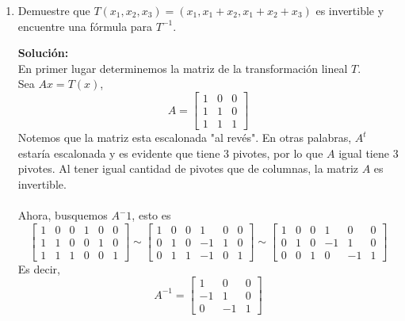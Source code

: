 \documentclass[12pt]{article}
\newenvironment{solucion}
{\begin{mdframed}[backgroundcolor=black!10]
		{\bf Solución:}\\
	}
	{
	\end{mdframed}
}
\newenvironment{preguntas}
{\begin{enumerate}\itemsep12pt
	}
	{
	\end{enumerate}
}
\begin{document}
\begin{preguntas}
\begin{solucion}
Luego,
$$I = [u_1\quad u_3-u_2+u_1\quad u_2-u_1]$$
Utilizando las propiedades mencionadas al principio,
$$I = [Av_1\quad A(v_3-v_2+v_1)\quad A(v_2-v_1)]$$
$$I = A[v_1\quad v_3-v_2+v_1\quad v_2-v_1]$$
$$A^{-1} = [v_1\quad v_3-v_2+v_1\quad v_2-v_1]$$
Por lo tanto, la inversa de $A$ corresponde a
$$A^{-1} = 
\begin{bmatrix}
1 &-1 & 0 \\
0 & 3 & -2 \\
1 &-2 &3 
\end{bmatrix}$$
\end{solucion}
\item Demuestre que $T(x_1,x_2, x_3)=(x_1,x_1+x_2, x_1+x_2+x_3)$ es invertible y encuentre una f\'ormula para $T^{-1}$.
\begin{solucion}
En primer lugar determinemos la matriz de la transformación lineal $T$.\\
Sea $Ax = T(x)$,
$$A = \begin{bmatrix}
1 & 0 & 0 \\
1 & 1 & 0 \\
1 & 1 & 1
\end{bmatrix}$$
Notemos que la matriz esta escalonada "al revés". En otras palabras, $A^t$ estaría escalonada y es evidente que tiene 3 pivotes, por lo que $A$ igual tiene 3 pivotes. Al tener igual cantidad de pivotes que de columnas, la matriz $A$ es invertible.\\
\\
Ahora, busquemos $A^-1$, esto es
$$\left[
\begin{array}{ccc|ccc}
1 & 0 & 0 & 1 & 0 & 0 \\
1 & 1 & 0 & 0 & 1 & 0 \\
1 & 1 & 1 & 0 & 0 & 1
\end{array}
\right] \sim 
\left[
\begin{array}{ccc|ccc}
1 & 0 & 0 & 1 & 0 & 0 \\
0 & 1 & 0 & -1 & 1 & 0 \\
0 & 1 & 1 & -1 & 0 & 1
\end{array}
\right] \sim 
\left[
\begin{array}{ccc|ccc}
1 & 0 & 0 & 1 & 0 & 0 \\
0 & 1 & 0 & -1 & 1 & 0 \\
0 & 0 & 1 & 0 & -1 & 1
\end{array}
\right]
$$
Es decir,
$$A^{-1} = 
\begin{bmatrix}
 1 & 0 & 0 \\
-1 & 1 & 0 \\
0 & -1 & 1

\end{bmatrix}$$
\end{solucion}
\end{preguntas}
\end{document}
